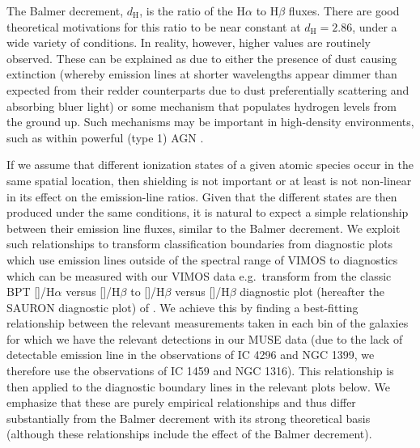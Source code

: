 		The Balmer decrement, $d_\mathrm{H}$, is the ratio of the H$\alpha$ to H$\beta$ fluxes. There are good theoretical motivations for this ratio to be near constant at $d_\mathrm{H} = 2.86$, under a wide variety of conditions. In reality, however, higher values are routinely observed. These can be explained as due to either the presence of dust causing extinction (whereby emission lines at shorter wavelengths appear dimmer than expected from their redder counterparts due to dust preferentially scattering and absorbing bluer light) or some mechanism that populates hydrogen levels from the ground up. Such mechanisms may be important in high-density environments, such as within powerful (type 1) AGN \citep[e.g.][]{Shields1974, Netzer1975}. 

		If we assume that different ionization states of a given atomic species occur in the same spatial location, then shielding is not important or at least is not non-linear in its effect on the emission-line ratios. Given that the different states are then produced under the same conditions, it is natural to expect a simple relationship between their emission line fluxes, similar to the Balmer decrement. We exploit such relationships to transform classification boundaries from diagnostic plots which use emission lines outside of the spectral range of VIMOS to diagnostics which can be measured with our VIMOS data e.g.\ transform from the classic BPT []/H$\alpha$ versus []/H$\beta$ to []/H$\beta$ versus []/H$\beta$ diagnostic plot (hereafter the SAURON diagnostic plot) of \citet{Sarzi2010}. We achieve this by finding a best-fitting relationship between the relevant measurements taken in each bin of the galaxies for which we have the relevant detections in our MUSE data (due to the lack of detectable emission line in the observations of IC 4296 and NGC 1399, we therefore use the observations of IC 1459 and NGC 1316). This relationship is then applied to the diagnostic boundary lines in the relevant plots below. We emphasize that these are purely empirical relationships and thus differ substantially from the Balmer decrement with its strong theoretical basis (although these relationships include the effect of the Balmer decrement). 

